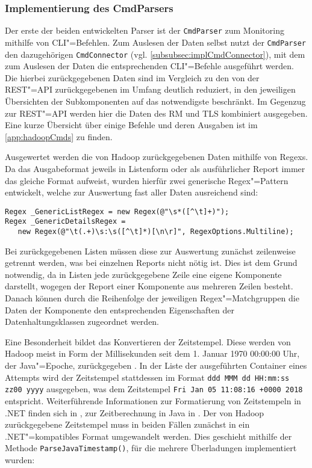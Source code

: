 \subsubsection{Implementierung des CmdParsers}
\label{subsubsec:implCmdParser}

Der erste der beiden entwickelten Parser ist der \texttt{CmdParser} zum Monitoring mithilfe von \gls{CLI}"=Befehlen.
Zum Auslesen der Daten selbst nutzt der \texttt{CmdParser} den dazugehörigen \texttt{CmdConnector} (vgl. \cref{subsubsec:implCmdConnector}), mit dem zum Auslesen der Daten die entsprechenden \gls{CLI}"=Befehle ausgeführt werden.
Die hierbei zurückgegebenen Daten sind im Vergleich zu den von der REST"=API zurückgegebenen im Umfang deutlich reduziert, in den jeweiligen Übersichten der Subkomponenten auf das notwendigste beschränkt.
Im Gegenzug zur REST"=API werden hier die Daten des \gls{RM} und \gls{TLS} kombiniert ausgegeben.
Eine kurze Übersicht über einige Befehle und deren Ausgaben ist im \cref{app:hadoopCmds} zu finden.

Ausgewertet werden die von Hadoop zurückgegebenen Daten mithilfe von \glspl{Regex}.
Da das Ausgabeformat jeweils in Listenform oder als ausführlicher Report immer das gleiche Format aufweist, wurden hierfür zwei generische Regex"=Pattern entwickelt, welche zur Auswertung fast aller Daten ausreichend sind:

\begin{lstlisting}[label=lst:cmdRegexPattern,style=cs,
caption={[Implementierte \glsentryshort{Regex}"=Pattern des CmdParsers]
    Implementierte \acrshort{Regex}"=Pattern des \texttt{CmdParser}s}]
Regex _GenericListRegex = new Regex(@"\s*([^\t]+)");
Regex _GenericDetailsRegex =
   new Regex(@"\t(.+)\s:\s([^\t]*)[\n\r]", RegexOptions.Multiline);
\end{lstlisting}

Bei zurückgegebenen Listen müssen diese zur Auswertung zunächst zeilenweise getrennt werden, was bei einzelnen Reports nicht nötig ist.
Dies ist dem Grund notwendig, da in Listen jede zurückgegebene Zeile eine eigene Komponente darstellt, wogegen der Report einer Komponente aus mehreren Zeilen besteht.
Danach können durch die Reihenfolge der jeweiligen Regex"=Matchgruppen die Daten der Komponente den entsprechenden Eigenschaften der Datenhaltungsklassen zugeordnet werden.

Eine Besonderheit bildet das Konvertieren der Zeitstempel.
Diese werden von Hadoop meist in Form der Millisekunden seit dem 1. Januar 1970 00:00:00 Uhr, der Java"=Epoche, zurückgegeben \cite{HadoopRmApi271,HadoopNmApi271,HadoopYarnTlServer271,JavaInstantDoc}.
In der Liste der ausgeführten Container eines Attempts wird der Zeitstempel stattdessen im Format \texttt{ddd MMM dd HH:mm:ss zz00 yyyy} ausgegeben, was \zB dem Zeitstempel \texttt{Fri Jan 05 11:08:16 +0000 2018} entspricht.
Weiterführende Informationen zur Formatierung von Zeitstempeln in .NET finden sich in \cite{CsTimeFormatStrings}, zur Zeitberechnung in Java \uA in \cite{JavaInstantDoc}.
Der von Hadoop zurückgegebene Zeitstempel muss in beiden Fällen zunächst in ein .NET"=kompatibles Format umgewandelt werden.
Dies geschieht mithilfe der Methode \texttt{ParseJavaTimestamp()}, für die mehrere Überladungen implementiert wurden:

